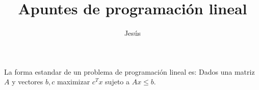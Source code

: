 \documentclass{article}
\title{Apuntes de programación lineal}
\author{Jesús}
\begin{document}
\maketitle
La forma estandar de un problema de programación lineal es:
Dados una matriz $A$ y vectores
$b,c$ maximizar $c^Tx$ sujeto a $Ax\leq b$.
\end{document}
